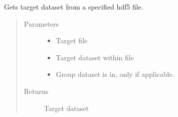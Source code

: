 \documentclass[letterpaper,10pt,english]{sphinxmanual}
\begin{document}
\begin{fulllineitems}
\label{\detokenize{index:HDF5Methods.getDataset}}
\sphinxAtStartPar
Gets target dataset from a specified hdf5 file.
\begin{quote}\begin{description}
\item[{Parameters}] \leavevmode\begin{itemize}
\item {} 
\sphinxAtStartPar
{} \textendash{} Target file

\item {} 
\sphinxAtStartPar
{} \textendash{} Target dataset within file

\item {} 
\sphinxAtStartPar
{} \textendash{} Group dataset is in, only if applicable.

\end{itemize}

\item[{Returns}] \leavevmode
\sphinxAtStartPar
Target dataset

\end{description}\end{quote}

\end{fulllineitems}

\end{document}
